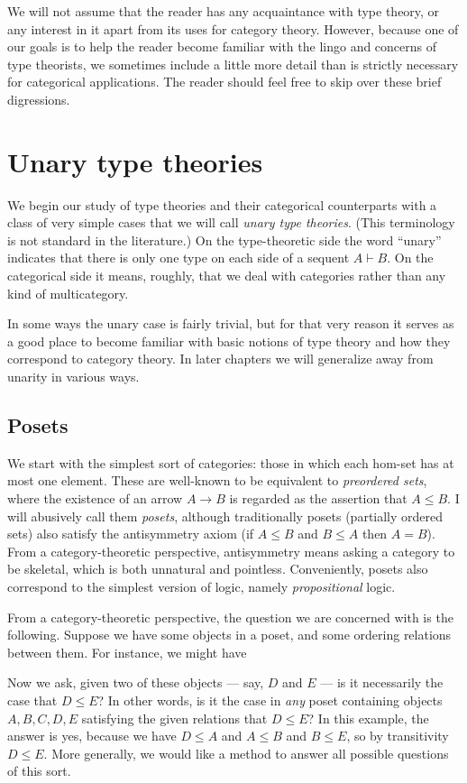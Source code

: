 \documentclass{book}
\let\types\vdash
\begin{document}
We will not assume that the reader has any acquaintance with type theory, or any interest in it apart from its uses for category theory.
However, because one of our goals is to help the reader become familiar with the lingo and concerns of type theorists, we sometimes include a little more detail than is strictly necessary for categorical applications.
The reader should feel free to skip over these brief digressions.



\chapter{Unary type theories}
\label{chap:unary}

We begin our study of type theories and their categorical counterparts with a class of very simple cases that we will call \emph{unary type theories}.
(This terminology is not standard in the literature.)
On the type-theoretic side the word ``unary'' indicates that there is only one type on each side of a sequent $A\types B$.
On the categorical side it means, roughly, that we deal with categories rather than any kind of multicategory.

In some ways the unary case is fairly trivial, but for that very reason it serves as a good place to become familiar with basic notions of type theory and how they correspond to category theory.
In later chapters we will generalize away from unarity in various ways.


\section{Posets}
\label{sec:poset}

We start with the simplest sort of categories: those in which each hom-set has at most one element.
These are well-known to be equivalent to \emph{preordered sets}, where the existence of an arrow $A\to B$ is regarded as the assertion that $A\le B$.
I will abusively call them \emph{posets}, although traditionally posets (partially ordered sets) also satisfy the antisymmetry axiom (if $A\le B$ and $B\le A$ then $A=B$).
From a category-theoretic perspective, antisymmetry means asking a category to be skeletal, which is both unnatural and pointless.
Conveniently, posets also correspond to the simplest version of logic, namely \emph{propositional} logic.

From a category-theoretic perspective, the question we are concerned with is the following.
Suppose we have some objects in a poset, and some ordering relations between them.
For instance, we might have
Now we ask, given two of these objects --- say, $D$ and $E$ --- is it necessarily the case that $D\le E$?
In other words, is it the case in \emph{any} poset containing objects $A,B,C,D,E$ satisfying the given relations that $D\le E$?
In this example, the answer is yes, because we have $D\le A$ and  $A\le B$ and $B\le E$, so by transitivity $D\le E$.
More generally, we would like a method to answer all possible questions of this sort.
\end{document}

